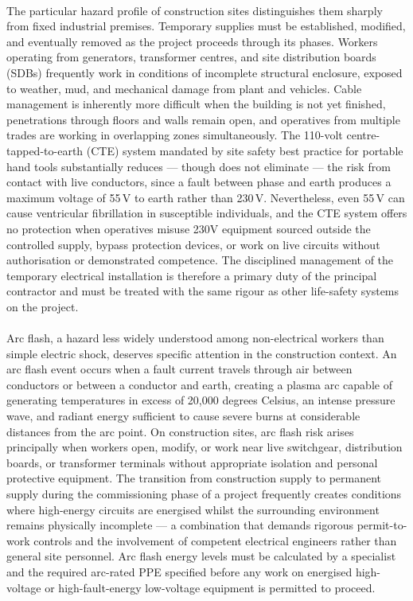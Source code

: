 \paragraph{}
The particular hazard profile of construction sites distinguishes them sharply from fixed industrial premises. Temporary supplies must be established, modified, and eventually removed as the project proceeds through its phases. Workers operating from generators, transformer centres, and site distribution boards (SDBs) frequently work in conditions of incomplete structural enclosure, exposed to weather, mud, and mechanical damage from plant and vehicles. Cable management is inherently more difficult when the building is not yet finished, penetrations through floors and walls remain open, and operatives from multiple trades are working in overlapping zones simultaneously. The 110-volt centre-tapped-to-earth (CTE) system mandated by site safety best practice for portable hand tools substantially reduces --- though does not eliminate --- the risk from contact with live conductors, since a fault between phase and earth produces a maximum voltage of 55\,V to earth rather than 230\,V. Nevertheless, even 55\,V can cause ventricular fibrillation in susceptible individuals, and the CTE system offers no protection when operatives misuse 230V equipment sourced outside the controlled supply, bypass protection devices, or work on live circuits without authorisation or demonstrated competence. The disciplined management of the temporary electrical installation is therefore a primary duty of the principal contractor and must be treated with the same rigour as other life-safety systems on the project.

\paragraph{}
Arc flash, a hazard less widely understood among non-electrical workers than simple electric shock, deserves specific attention in the construction context. An arc flash event occurs when a fault current travels through air between conductors or between a conductor and earth, creating a plasma arc capable of generating temperatures in excess of 20{,}000 degrees Celsius, an intense pressure wave, and radiant energy sufficient to cause severe burns at considerable distances from the arc point. On construction sites, arc flash risk arises principally when workers open, modify, or work near live switchgear, distribution boards, or transformer terminals without appropriate isolation and personal protective equipment. The transition from construction supply to permanent supply during the commissioning phase of a project frequently creates conditions where high-energy circuits are energised whilst the surrounding environment remains physically incomplete --- a combination that demands rigorous permit-to-work controls and the involvement of competent electrical engineers rather than general site personnel. Arc flash energy levels must be calculated by a specialist and the required arc-rated PPE specified before any work on energised high-voltage or high-fault-energy low-voltage equipment is permitted to proceed.

